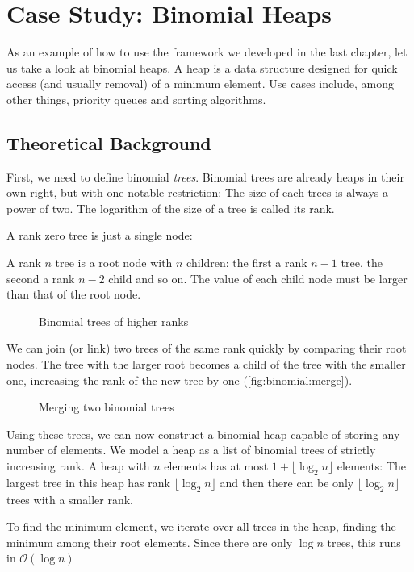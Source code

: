 
\chapter{Case Study: Binomial Heaps}
As an example of how to use the framework we developed in the last chapter, let us take a look at binomial heaps. A heap is a data structure designed for quick access (and usually removal) of a minimum element. Use cases include, among other things, priority queues and sorting algorithms.

\section{Theoretical Background}
First, we need to define binomial \emph{trees}. Binomial trees are already heaps in their own right, but with one notable restriction: The size of each trees is always a power of two. The logarithm of the size of a tree is called its rank.

A rank zero tree is just a single node:

\begin{figure}[h]
\begin{center}
    
\end{center}
\end{figure}

A rank $n$ tree is a root node with $n$ children: the first a rank $n-1$ tree, the second a rank $n-2$ child and so on. The value of each child node must be larger than that of the root node.

\begin{figure}[h]
\begin{center}
    
\end{center}
\caption{Binomial trees of higher ranks}
\label{fig:binomial:rankn}
\end{figure}

We can join (or link) two trees of the same rank quickly by comparing their root nodes. The tree with the larger root becomes a child of the tree with the smaller one, increasing the rank of the new tree by one (\autoref{fig:binomial:merge}).

\begin{figure}[h]
\begin{center}
    
\end{center}
\caption{Merging two binomial trees}
\label{fig:binomial:merge}
\end{figure}

Using these trees, we can now construct a binomial heap capable of storing any number of elements. We model a heap as a list of binomial trees of strictly increasing rank. A heap with $n$ elements has at most $1 + \lfloor \log_2 n \rfloor$ elements: The largest tree in this heap has rank $\lfloor \log_2 n \rfloor$ and then there can be only $\lfloor \log_2 n \rfloor$ trees with a smaller rank.

To find the minimum element, we iterate over all trees in the heap, finding the minimum among their root elements. Since there are only $\log n$ trees, this runs in $\mathcal O(\log n)$